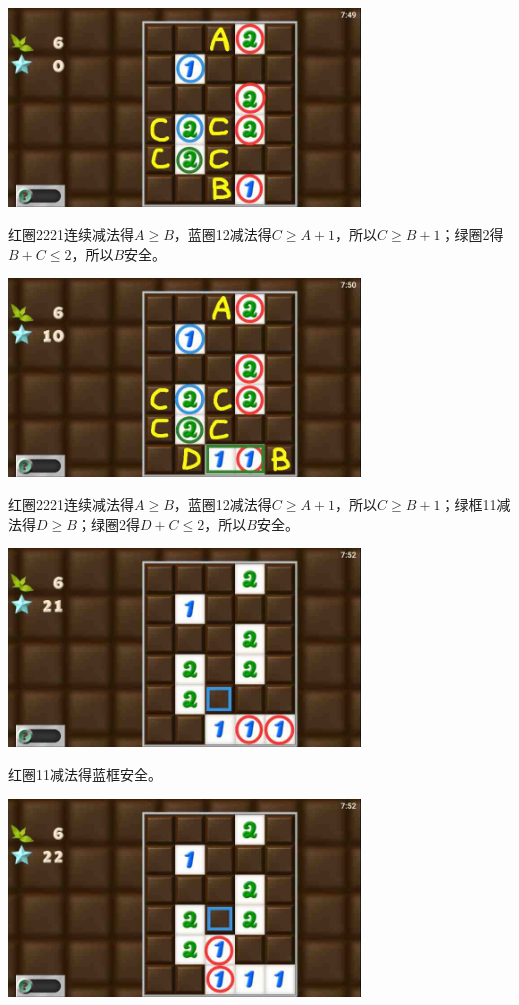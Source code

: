 \subsection{} %
\begin{center}
    \includegraphics[width=0.7\textwidth]{puzzlelow/218-1.jpg}
\end{center}
红圈2221连续减法得$A\ge B$，蓝圈12减法得$C\ge A+1$，所以$C\ge B+1$；绿圈2得$B+C\le 2$，所以$B$安全。
\begin{center}
    \includegraphics[width=0.7\textwidth]{puzzlelow/218-2.jpg}
\end{center}
红圈2221连续减法得$A\ge B$，蓝圈12减法得$C\ge A+1$，所以$C\ge B+1$；绿框11减法得$D\ge B$；绿圈2得$D+C\le 2$，所以$B$安全。
\begin{center}
    \includegraphics[width=0.7\textwidth]{puzzlelow/218-3.jpg}
\end{center}
红圈11减法得蓝框安全。
\begin{center}
    \includegraphics[width=0.7\textwidth]{puzzlelow/218-4.jpg}
\end{center}
